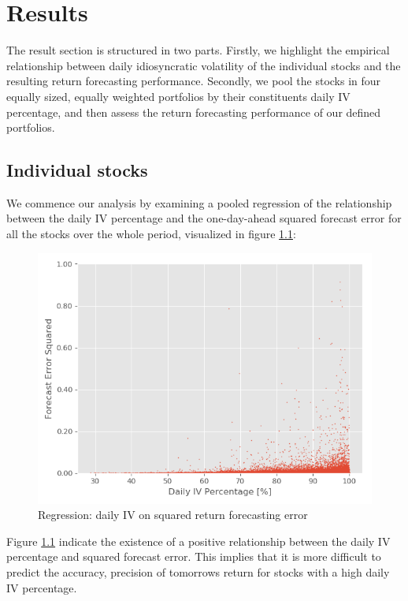 \chapter{Results}
\label{Results}
The result section is structured in two parts. Firstly, we highlight the empirical relationship between daily idiosyncratic volatility of the individual stocks and the resulting return forecasting performance. Secondly, we pool the stocks in four equally sized, equally weighted portfolios by their constituents daily IV percentage, and then assess the return forecasting performance of our defined portfolios.

\section{Individual stocks}

We commence our analysis by examining a pooled regression of the relationship between the daily IV percentage and the one-day-ahead squared forecast error for all the stocks over the whole period, visualized in figure \ref{Scatter regression}: 

\begin{figure}[h]
    \centering
    \includegraphics[scale = 0.5]{Plot/ScatterRegression.png}
    \caption{Regression: daily IV on squared return forecasting error}
    \label{Scatter regression}
\end{figure}

Figure \ref{Scatter regression} indicate the existence of a positive relationship between the daily IV percentage and squared forecast error. This implies that it is more difficult to predict the accuracy, precision of tomorrows return for stocks with a high daily IV percentage.

